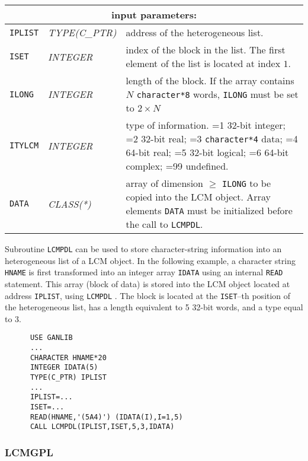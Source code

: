 \noindent
\begin{tabular}{|p{1.5cm}|p{3cm}|p{10cm}|}
\hline
\multicolumn{3}{|c|}{\bf input parameters:} \\
\hline
{\tt IPLIST} & {\it TYPE(C\_PTR)} & address of the heterogeneous list. \\
\hline
{\tt ISET} & {\it INTEGER} &  index of the block in the list.
The first element of the list is located at index $1$.\\
\hline
{\tt ILONG} & {\it INTEGER} &  length of the block. If the array contains $N$ {\tt character*8} words, 
                                   {\tt ILONG} must be set to $2 \times N$ \\
\hline
{\tt ITYLCM} & {\it INTEGER} & type of information. =1 32-bit integer; 
                                    =2 32-bit real; =3 {\tt character*4} data; 
				    =4 64-bit real; =5 32-bit logical; =6 64-bit complex; =99 undefined. \\
\hline
{\tt DATA} & {\it CLASS(*)} & array of dimension $\ge$ {\tt ILONG} to be copied into the LCM object. 
                                   Array elements {\tt DATA} must be initialized before the call to {\tt LCMPDL}. \\
\hline
\end{tabular}

\vskip 0.4cm

Subroutine {\tt LCMPDL}  can be used to store character-string information into an heterogeneous list of a LCM object. In the
following example, a character string {\tt HNAME} is first transformed into an integer array {\tt IDATA}
using an internal {\tt READ} statement. This array (block of data) is stored into the LCM object located at
address {\tt IPLIST}, using {\tt LCMPDL} . The block is located at the {\tt ISET}--th position of the heterogeneous list, has a length equivalent to 5 32-bit words, and a type
equal to 3.

\begin{verbatim}
      USE GANLIB
      ...
      CHARACTER HNAME*20
      INTEGER IDATA(5)
      TYPE(C_PTR) IPLIST
      ...
      IPLIST=...
      ISET=...
      READ(HNAME,'(5A4)') (IDATA(I),I=1,5)
      CALL LCMPDL(IPLIST,ISET,5,3,IDATA)
\end{verbatim}

\subsubsection{LCMGPL}

